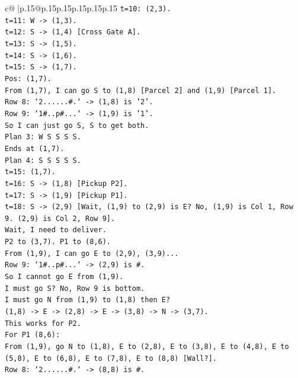 \documentclass{article}
\begin{document}
{\begin{supertabular}{c@{$\;$}|p{.15\linewidth}@{}p{.15\linewidth}p{.15\linewidth}p{.15\linewidth}p{.15\linewidth}p{.15\linewidth}}
{{{\texttt{t=10: (2,3).} \\
\texttt{t=11: W {-}> (1,3).} \\
\texttt{t=12: S {-}> (1,4) {[}Cross Gate A{]}.} \\
\texttt{t=13: S {-}> (1,5).} \\
\texttt{t=14: S {-}> (1,6).} \\
\texttt{t=15: S {-}> (1,7).} \\
\texttt{Pos: (1,7).} \\
\texttt{From (1,7), I can go S to (1,8) {[}Parcel 2{]} and (1,9) {[}Parcel 1{]}.} \\
\texttt{Row 8: `2......\#.` {-}> (1,8) is '2'.} \\
\texttt{Row 9: `1\#..p\#...` {-}> (1,9) is '1'.} \\
\texttt{So I can just go S, S to get both.} \\
\texttt{Plan 3: W S S S S.} \\
\texttt{Ends at (1,7).} \\
\texttt{Plan 4: S S S S S.} \\
\texttt{t=15: (1,7).} \\
\texttt{t=16: S {-}> (1,8) {[}Pickup P2{]}.} \\
\texttt{t=17: S {-}> (1,9) {[}Pickup P1{]}.} \\
\texttt{t=18: S {-}> (2,9) {[}Wait, (1,9) to (2,9) is E? No, (1,9) is Col 1, Row 9. (2,9) is Col 2, Row 9{]}.} \\
\texttt{Wait, I need to deliver.} \\
\texttt{P2 to (3,7). P1 to (8,6).} \\
\texttt{From (1,9), I can go E to (2,9), (3,9)...} \\
\texttt{Row 9: `1\#..p\#...` {-}> (2,9) is \#.} \\
\texttt{So I cannot go E from (1,9).} \\
\texttt{I must go S? No, Row 9 is bottom.} \\
\texttt{I must go N from (1,9) to (1,8) then E?} \\
\texttt{(1,8) {-}> E {-}> (2,8) {-}> E {-}> (3,8) {-}> N {-}> (3,7).} \\
\texttt{This works for P2.} \\
\texttt{For P1 (8,6):} \\
\texttt{From (1,9), go N to (1,8), E to (2,8), E to (3,8), E to (4,8), E to (5,8), E to (6,8), E to (7,8), E to (8,8) {[}Wall?{]}.} \\
\texttt{Row 8: `2......\#.` {-}> (8,8) is \#.} \\
}}}
\end{supertabular}}
\end{document}
